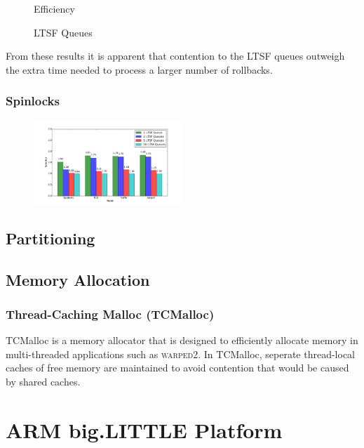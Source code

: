 \documentclass[11pt]{book}
\begin{document}
\begin{figure}
\begin{minipage}{.5\textwidth}
\begin{center}
      Efficiency \\
    \end{center}
  \end{minipage}
  \caption{LTSF Queues}\label{ltsf_analysis}
\end{figure}

From these results it is apparent that contention to the LTSF queues outweigh the extra time
needed to process a larger number of rollbacks.



\subsection{Spinlocks}

\begin{figure}
\centering
  \includegraphics[width=0.5\textwidth]{figs/pending_event_set/spinlock_speedup.pdf}
\end{figure}

\section{Partitioning}


\section{Memory Allocation}

\subsection{Thread-Caching Malloc (TCMalloc)}

TCMalloc is a memory allocator that is designed to efficiently allocate memory in
multi-threaded applications such as \textsc{warped2}. In TCMalloc, seperate thread-local
caches of free memory are maintained to avoid contention that would be caused by shared
caches.

\chapter{ARM big.LITTLE Platform}\label{big_little_platform}
\end{document}
